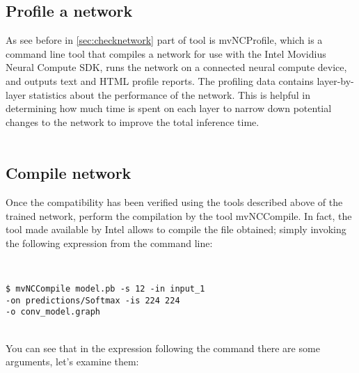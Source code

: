 \subsection{Profile a network}
As see before in \ref{sec:checknetwork} part of tool is mvNCProfile, which is 
a command line tool that compiles a network for use with the 
Intel Movidius Neural Compute SDK, runs the network on a connected neural 
compute device, and outputs text and HTML profile reports.
The profiling data contains layer-by-layer statistics about the performance of 
the network. 
This is helpful in determining how much time is spent on each layer to narrow 
down potential changes to the network to improve the total inference time.\\\\
{\tiny\texttt{}}
%
\subsection{Compile network}
\label{subsec:compilenetwork}
Once the compatibility has been verified using the tools described above of the 
trained network, perform the compilation by the tool mvNCCompile.
In fact, the tool made available by Intel allows to compile the file obtained; 
simply invoking the following expression from the command line:\\
{
\\
\begin{mycolorbox}[colback=light-gray]
	\scriptsize{\texttt{\$ mvNCCompile model.pb -s 12 -in input\_1 \\-on predictions/Softmax -is 224 224 \\-o conv\_model.graph}}
\end{mycolorbox}
}
\\You can see that in the expression following the command there are some 
arguments, let's examine them:
